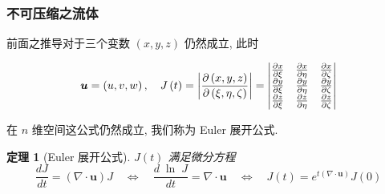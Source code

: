 \documentclass[aspectratio=2516]{beamer}
\newtheorem{thm}{\kaishu 定理}
\begin{document}

\begin{frame}
\frametitle{\kaishu 不可压缩之流体}
\kaishu 

前面之推导对于三个变数 $\left( {x,y,z} \right)$ 仍然成立, 此时

\begin{equation}
	\boldsymbol{u} = \left(u,v,w\right), \quad J\left( t \right) = \left| {\frac{{\partial \left( {x,y,z} \right)}}{{\partial \left( {\xi ,\eta ,\zeta } \right)}}} \right| = 	\left| {\begin{matrix}
		{\frac{{\partial x}}{{\partial \xi }}} & {\frac{{\partial x}}{{\partial \eta }}} & {\frac{{\partial x}}{{\partial \zeta }}}  \\ 
		{\frac{{\partial y}}{{\partial \xi }}} & {\frac{{\partial y}}{{\partial \eta }}} & {\frac{{\partial y}}{{\partial \zeta }}}  \\ 
		{\frac{{\partial z}}{{\partial \xi }}} & {\frac{{\partial z}}{{\partial \eta }}} & {\frac{{\partial z}}{{\partial \zeta }}}  \\ 
		\end{matrix} } \right|
	\notag 
\end{equation}

在 $ n $ 维空间这公式仍然成立, 我们称为 Euler 展开公式.

\begin{thm}[\kaishu Euler 展开公式]
	\kaishu 
	$ J\left(t\right) $ 满足微分方程
	\begin{equation}
		\frac{{dJ}}{{dt}} = \left( {\nabla  \cdot \boldsymbol{u}} \right)J \quad \Leftrightarrow \quad  \frac{{d\;\ln \;J}}{{dt}} = \nabla  \cdot \boldsymbol{u} \quad \Leftrightarrow \quad  J\left( t \right) = {e^{t\left( {\nabla  \cdot \boldsymbol{u}} \right)}}J\left( 0 \right)
		\label{eq5.2.3}
	\end{equation}
\end{thm}
\end{frame}


\end{document}
